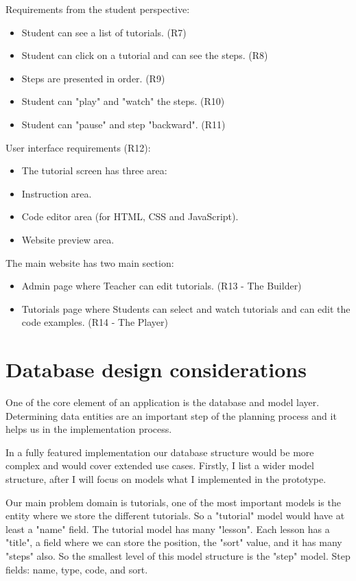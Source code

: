 \documentclass[11pt, a4paper, oneside, openright, medskipamount]{report}
\begin{document}
\noindent Requirements from the student perspective:
\begin{itemize}[noitemsep]
\item Student can see a list of tutorials. (R7)
\item Student can click on a tutorial and can see the steps. (R8)
\item Steps are presented in order. (R9)
\item Student can "play" and "watch" the steps. (R10)
\item Student can "pause" and step "backward". (R11)
\end{itemize}

\noindent User interface requirements (R12):
\begin{itemize}[noitemsep]
\item The tutorial screen has three area:
\item Instruction area.
\item Code editor area (for HTML, CSS and JavaScript).
\item Website preview area.
\end{itemize}

\noindent The main website has two main section:
\begin{itemize}[noitemsep]
\item Admin page where Teacher can edit tutorials. (R13 - The Builder)
\item Tutorials page where Students can select and watch tutorials and can edit the code examples. (R14 - The Player)
\end{itemize}

\section{Database design considerations} \label{database-design}

One of the core element of an application is the database and model layer. Determining data entities are an important step of the planning process and it helps us in the implementation process.

In a fully featured implementation our database structure would be more complex and would cover extended use cases. Firstly, I list a wider model structure, after I will focus on models what I implemented in the prototype.

Our main problem domain is tutorials, one of the most important models is the entity where we store the different tutorials. So a "tutorial" model would have at least a "name" field. The tutorial model has many "lesson". Each lesson has a "title", a field where we can store the position, the "sort" value, and it has many "steps" also. So the smallest level of this model structure is the "step" model. Step fields: name, type, code, and sort.
\end{document}
